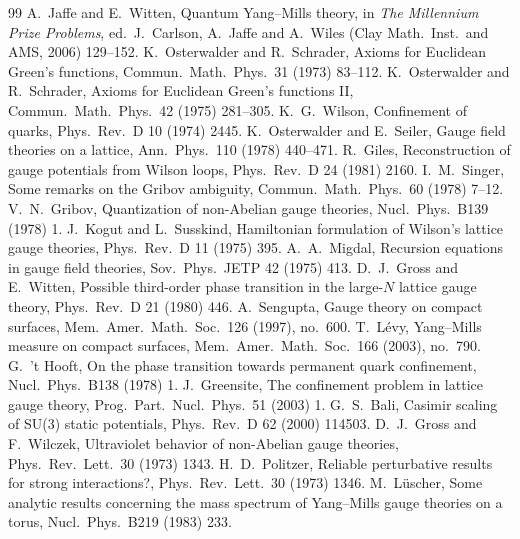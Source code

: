 \begin{thebibliography}{99}\setlength{\itemsep}{0pt}
 A.~Jaffe and E.~Witten, Quantum Yang--Mills theory, in \emph{The Millennium Prize Problems}, ed.\ J.~Carlson, A.~Jaffe and A.~Wiles (Clay Math.\ Inst.\ and AMS, 2006) 129--152.
 K.~Osterwalder and R.~Schrader, Axioms for Euclidean Green's functions, Commun.\ Math.\ Phys.\ 31 (1973) 83--112.
 K.~Osterwalder and R.~Schrader, Axioms for Euclidean Green's functions II, Commun.\ Math.\ Phys.\ 42 (1975) 281--305.
 K.~G.~Wilson, Confinement of quarks, Phys.\ Rev.\ D 10 (1974) 2445.
 K.~Osterwalder and E.~Seiler, Gauge field theories on a lattice, Ann.\ Phys.\ 110 (1978) 440--471.
 R.~Giles, Reconstruction of gauge potentials from Wilson loops, Phys.\ Rev.\ D 24 (1981) 2160.
 I.~M.~Singer, Some remarks on the Gribov ambiguity, Commun.\ Math.\ Phys.\ 60 (1978) 7--12.
 V.~N.~Gribov, Quantization of non-Abelian gauge theories, Nucl.\ Phys.\ B139 (1978) 1.
 J.~Kogut and L.~Susskind, Hamiltonian formulation of Wilson's lattice gauge theories, Phys.\ Rev.\ D 11 (1975) 395.
 A.~A.~Migdal, Recursion equations in gauge field theories, Sov.\ Phys.\ JETP 42 (1975) 413.
 D.~J.~Gross and E.~Witten, Possible third-order phase transition in the large-$N$ lattice gauge theory, Phys.\ Rev.\ D 21 (1980) 446.
 A.~Sengupta, Gauge theory on compact surfaces, Mem.\ Amer.\ Math.\ Soc.\ 126 (1997), no.~600.
 T.~L\'evy, Yang--Mills measure on compact surfaces, Mem.\ Amer.\ Math.\ Soc.\ 166 (2003), no.~790.
 G.~'t Hooft, On the phase transition towards permanent quark confinement, Nucl.\ Phys.\ B138 (1978) 1.
 J.~Greensite, The confinement problem in lattice gauge theory, Prog.\ Part.\ Nucl.\ Phys.\ 51 (2003) 1.
 G.~S.~Bali, Casimir scaling of SU(3) static potentials, Phys.\ Rev.\ D 62 (2000) 114503.
 D.~J.~Gross and F.~Wilczek, Ultraviolet behavior of non-Abelian gauge theories, Phys.\ Rev.\ Lett.\ 30 (1973) 1343.
 H.~D.~Politzer, Reliable perturbative results for strong interactions?, Phys.\ Rev.\ Lett.\ 30 (1973) 1346.
 M.~L\"uscher, Some analytic results concerning the mass spectrum of Yang--Mills gauge theories on a torus, Nucl.\ Phys.\ B219 (1983) 233.

\end{thebibliography}
